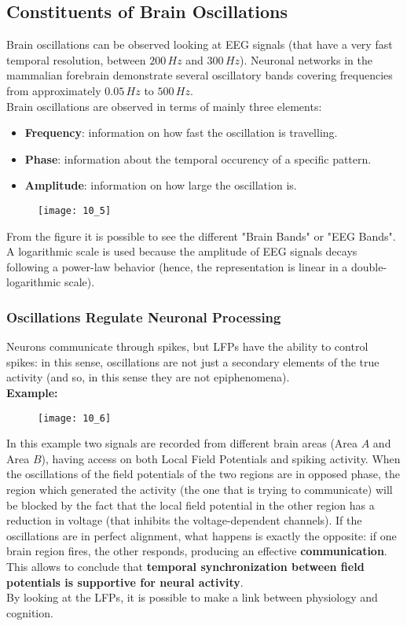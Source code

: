 \subsection{Constituents of Brain Oscillations}
Brain oscillations can be observed looking at EEG signals (that have a very fast temporal resolution, between \(200\,Hz\) and \(300\,Hz\)).
Neuronal networks in the mammalian forebrain demonstrate several oscillatory bands covering frequencies from approximately \(0.05\,Hz\) to \(500\,Hz\).\\
Brain oscillations are observed in terms of mainly three elements:
\begin{itemize}
    \item \textbf{Frequency}: information on how fast the oscillation is travelling.
    \item \textbf{Phase}: information about the temporal occurency of a specific pattern.
    \item \textbf{Amplitude}: information on how large the oscillation is.
\end{itemize}
\begin{figure}[H]
    \texttt{[image: 10\_5]}
    \centering
\end{figure}
From the figure it is possible to see the different "Brain Bands" or "EEG Bands". A logarithmic scale is used because the amplitude of EEG 
signals decays following a power-law behavior (hence, the representation is linear in a double-logarithmic scale).

\subsubsection{Oscillations Regulate Neuronal Processing}
Neurons communicate through spikes, but LFPs have the ability to control spikes: in this sense, 
oscillations are not just a secondary elements of the true activity (and so, in this sense they are not epiphenomena).\\

\textbf{Example:}
\begin{figure}[H]
    \texttt{[image: 10\_6]}
    \centering
\end{figure}
In this example two signals are recorded from different brain areas (Area \(A\) and Area \(B\)), having access on both Local Field Potentials and spiking 
activity. When the oscillations of the field potentials of the two regions are in opposed phase, the region which generated the activity (the one that is 
trying to communicate) will be blocked by the fact that the local field potential in the other region has a reduction in voltage (that inhibits the voltage-dependent 
channels). If the oscillations are in perfect alignment, what happens is exactly the opposite: if one brain region fires, the other responds, producing an effective \textbf{
communication}. This allows to conclude that \textbf{temporal synchronization between field potentials is supportive for neural activity}.\\
By looking at the LFPs, it is possible to make a link between physiology and cognition.

